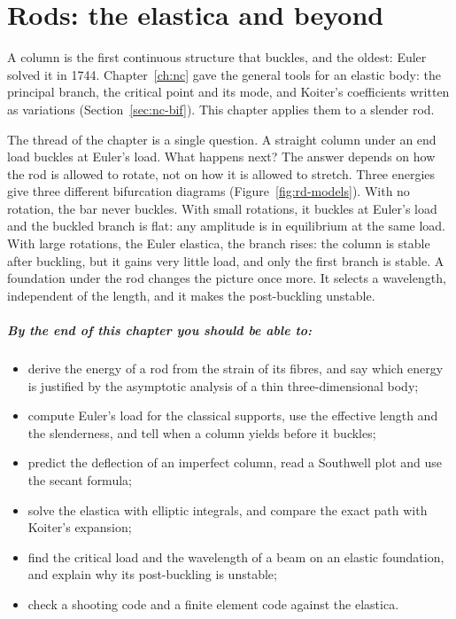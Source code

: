 \chapter{Rods: the elastica and beyond}\label{ch:rd}

A column is the first continuous structure that buckles, and the oldest: Euler solved it in
1744. Chapter~\ref{ch:nc} gave the general tools for an elastic body: the principal branch,
the critical point and its mode, and Koiter's coefficients written as variations
(Section~\ref{sec:nc-bif}). This chapter applies them to a slender rod.

The thread of the chapter is a single question. A straight column under an end load
buckles at Euler's load. What happens next? The answer depends on how the rod is allowed
to rotate, not on how it is allowed to stretch. Three energies give three different
bifurcation diagrams (Figure~\ref{fig:rd-models}). With no rotation, the bar never buckles.
With small rotations, it buckles at Euler's load and the buckled branch is flat: any
amplitude is in equilibrium at the same load. With large rotations, the Euler elastica, the
branch rises: the column is stable after buckling, but it gains very little load, and only the
first branch is stable. A
foundation under the rod changes the picture once more. It selects a wavelength, independent
of the length, and it makes the post-buckling unstable.

\paragraph{By the end of this chapter you should be able to:}
\begin{itemize}
  \item derive the energy of a rod from the strain of its fibres, and say which energy is
        justified by the asymptotic analysis of a thin three-dimensional body;
  \item compute Euler's load for the classical supports, use the effective length and the
        slenderness, and tell when a column yields before it buckles;
  \item predict the deflection of an imperfect column, read a Southwell plot and use the
        secant formula;
  \item solve the elastica with elliptic integrals, and compare the exact path with
        Koiter's expansion;
  \item find the critical load and the wavelength of a beam on an elastic foundation, and
        explain why its post-buckling is unstable;
  \item check a shooting code and a finite element code against the elastica.
\end{itemize}

